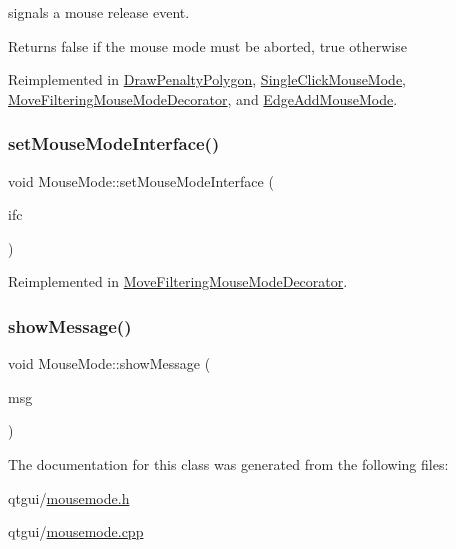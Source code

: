 signals a mouse release event. 

\begin{DoxyReturn}{Returns}
false if the mouse mode must be aborted, true otherwise 
\end{DoxyReturn}


Reimplemented in \mbox{\hyperlink{class_draw_penalty_polygon_a6e6baf20d2b77cca3d4b15b2c8a64c16}{Draw\+Penalty\+Polygon}}, \mbox{\hyperlink{class_single_click_mouse_mode_a182c0fae56fb11784de5f7f1a5a21234}{Single\+Click\+Mouse\+Mode}}, \mbox{\hyperlink{class_move_filtering_mouse_mode_decorator_a331745d728889576d415a0e6f20aa236}{Move\+Filtering\+Mouse\+Mode\+Decorator}}, and \mbox{\hyperlink{class_edge_add_mouse_mode_aee2cc27c8e2d482869c885b94d944026}{Edge\+Add\+Mouse\+Mode}}.

\mbox{\label{class_mouse_mode_acb2cde6c1de5c6e3ac065bcf45604c98}} 
\subsubsection{\texorpdfstring{setMouseModeInterface()}{setMouseModeInterface()}}
{\footnotesize\ttfamily void Mouse\+Mode\+::set\+Mouse\+Mode\+Interface (\begin{DoxyParamCaption}\item[{\mbox{\hyperlink{class_mouse_mode_interface}{Mouse\+Mode\+Interface}} $\ast$}]{ifc }\end{DoxyParamCaption})\hspace{0.3cm}{\ttfamily [virtual]}}



Reimplemented in \mbox{\hyperlink{class_move_filtering_mouse_mode_decorator_ab275ef7f3f65b4f1c58c937e167c55d3}{Move\+Filtering\+Mouse\+Mode\+Decorator}}.

\mbox{\label{class_mouse_mode_a7c9976cfe349be0d09131faf6dcfa039}} 
\subsubsection{\texorpdfstring{showMessage()}{showMessage()}}
{\footnotesize\ttfamily void Mouse\+Mode\+::show\+Message (\begin{DoxyParamCaption}\item[{Q\+String}]{msg }\end{DoxyParamCaption})\hspace{0.3cm}{\ttfamily [protected]}}



The documentation for this class was generated from the following files\+:\begin{DoxyCompactItemize}
\item 
qtgui/\mbox{\hyperlink{mousemode_8h}{mousemode.\+h}}\item 
qtgui/\mbox{\hyperlink{mousemode_8cpp}{mousemode.\+cpp}}\end{DoxyCompactItemize}
